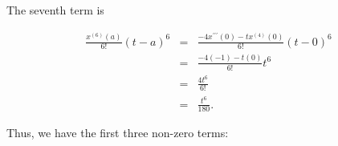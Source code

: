 The seventh term is

\begin{eqnarray*}
	\frac{x^{\left(6\right)}\left(a\right)}{6!}\left(t-a\right)^6&=&\frac{-4x^{\prime\prime\prime}\left(0\right)-tx^{\left(4\right)}\left(0\right)}{6!}\left(t-0\right)^6\\
	&=&\frac{-4\left(-1\right)-t\left(0\right)}{6!}t^6\\
	&=&\frac{4t^6}{6!}\\
	&=&\frac{t^6}{180}.
\end{eqnarray*}

Thus, we have the first three non-zero terms:

\begin{multienumerate}
\end{multienumerate}
